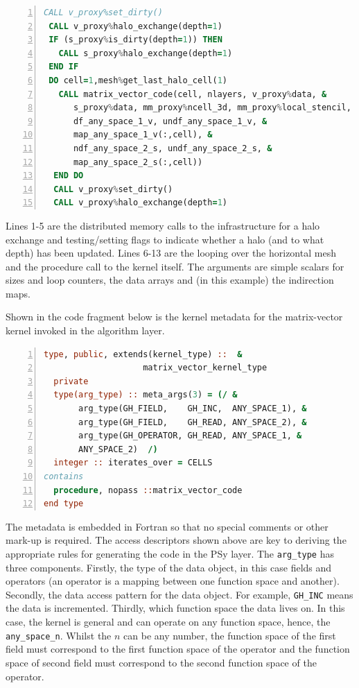 \documentclass[review,times]{elsarticle}
\begin{document}
\begin{lstlisting}[language=Fortran, numbers=left,caption={Code 
fragment of the generated PSy layer},label={lst:PSy1}]
 CALL v_proxy%set_dirty()
 CALL v_proxy%halo_exchange(depth=1)
 IF (s_proxy%is_dirty(depth=1)) THEN
   CALL s_proxy%halo_exchange(depth=1)
 END IF 
 DO cell=1,mesh%get_last_halo_cell(1)
   CALL matrix_vector_code(cell, nlayers, v_proxy%data, &
      s_proxy%data, mm_proxy%ncell_3d, mm_proxy%local_stencil, &
      df_any_space_1_v, undf_any_space_1_v, &
      map_any_space_1_v(:,cell), &
      ndf_any_space_2_s, undf_any_space_2_s, &
      map_any_space_2_s(:,cell))
  END DO 
  CALL v_proxy%set_dirty()
  CALL v_proxy%halo_exchange(depth=1)
\end{lstlisting}
Lines 1-5 are the distributed
memory calls to the infrastructure for a halo exchange and
testing/setting flags to indicate whether a halo (and to what depth)
has been updated. Lines 6-13 are the looping over the horizontal mesh
and the procedure call to the kernel itself. The arguments are simple
scalars for sizes and loop counters, the data arrays and (in this example)
the indirection maps. 


Shown in the code fragment below is the kernel metadata for the
matrix-vector kernel invoked in the algorithm layer.
\begin{lstlisting}[language=Fortran, numbers=left,caption={Code
fragment showing kernel metadata for the matrix-vector operator kernel},label={lst:metadata}]
type, public, extends(kernel_type) ::  &
                    matrix_vector_kernel_type
  private
  type(arg_type) :: meta_args(3) = (/ &
       arg_type(GH_FIELD,    GH_INC,  ANY_SPACE_1), &
       arg_type(GH_FIELD,    GH_READ, ANY_SPACE_2), &
       arg_type(GH_OPERATOR, GH_READ, ANY_SPACE_1, &
       ANY_SPACE_2)  /)
  integer :: iterates_over = CELLS
contains
  procedure, nopass ::matrix_vector_code
end type
\end{lstlisting}
The metadata is embedded in Fortran so that no special comments or
other mark-up is required. The access descriptors shown above are key
to deriving the appropriate rules for generating the code in the PSy
layer. The \verb+arg_type+ has three components. Firstly, the type of
the data object, in this case fields and operators (an
operator is a mapping between one function space and another). Secondly,
the data access pattern for the data object. For example, \verb+GH_INC+ means the data is
incremented. Thirdly, which function space the data lives on. In this case, the
kernel is general and can operate on any function space, hence, the
\verb+any_space_n+. Whilst the $n$ can be any number, the function space of the
first field must correspond to the first function space of the operator and the
function space of second field must correspond to the second function
space of the operator. 
\end{document}
